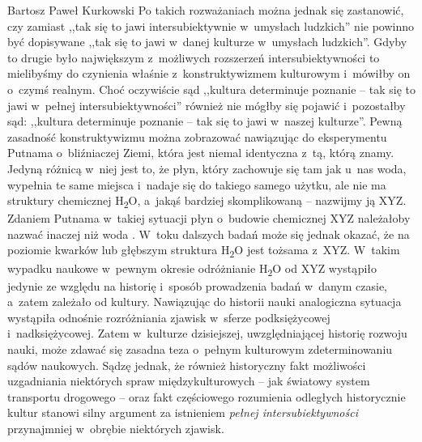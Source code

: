 \begin{artplenv}{Bartosz Paweł Kurkowski}
Po takich rozważaniach można jednak się zastanowić, czy zamiast ,,tak się to jawi intersubiektywnie w~umysłach ludzkich''
nie powinno być dopisywane ,,tak się to jawi w~danej kulturze w~umysłach ludzkich''. Gdyby to drugie było
największym z~możliwych rozszerzeń intersubiektywności to mielibyśmy do czynienia właśnie z~konstruktywizmem kulturowym
i~mówiłby on o~czymś realnym. Choć oczywiście sąd ,,kultura determinuje poznanie -- tak się to jawi w~pełnej intersubiektywności''
również nie mógłby się pojawić i~pozostałby sąd: ,,kultura determinuje poznanie -- tak się to jawi w~naszej kulturze''.
Pewną zasadność konstruktywizmu można zobrazować nawiązując do eksperymentu Putnama o~bliźniaczej Ziemi, która jest
niemal identyczna z~tą, którą znamy. Jedyną różnicą w~niej jest to, że płyn, który zachowuje się tam jak u~nas woda,
wypełnia te same miejsca i~nadaje się do takiego samego użytku, ale nie ma struktury chemicznej H\textsubscript{2}O,
a~jakąś bardziej skomplikowaną -- nazwijmy ją XYZ. Zdaniem Putnama w~takiej sytuacji płyn o~budowie chemicznej XYZ
należałoby nazwać inaczej niż woda
\parencite[s.~61]{grobler_prawda_2000}.
W~toku dalszych badań może się
jednak okazać, że na poziomie kwarków lub głębszym struktura H\textsubscript{2}O jest tożsama z~XYZ. W~takim wypadku
naukowe w~pewnym okresie odróżnianie H\textsubscript{2}O od XYZ wystąpiło jedynie ze względu na historię i~sposób
prowadzenia badań w~danym czasie, a~zatem zależało od kultury. Nawiązując do historii nauki analogiczna sytuacja
wystąpiła odnośnie rozróżniania zjawisk w~sferze podksiężycowej i~nadksiężycowej. Zatem w~kulturze dzisiejszej,
uwzględniającej historię rozwoju nauki, może zdawać się zasadna teza o~pełnym kulturowym zdeterminowaniu sądów
naukowych. Sądzę jednak, że również historyczny fakt możliwości uzgadniania niektórych spraw międzykulturowych -- jak
światowy system transportu drogowego -- oraz fakt częściowego rozumienia odległych historycznie kultur stanowi silny
argument za istnieniem \textit{pełnej intersubiektywności} przynajmniej w~obrębie niektórych zjawisk.



\end{artplenv}
